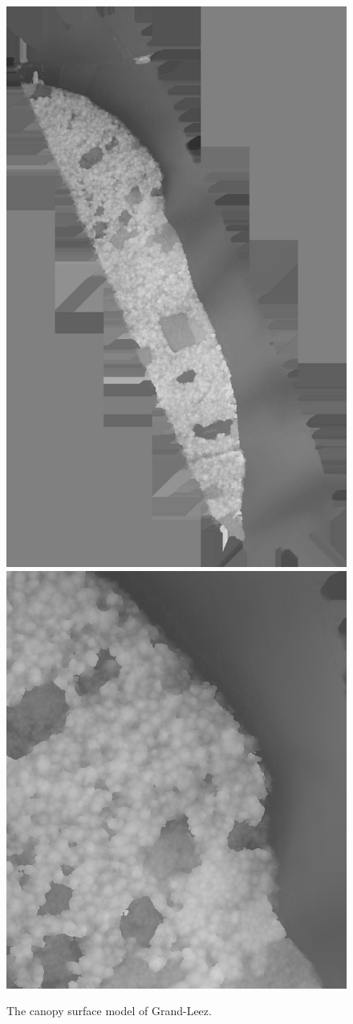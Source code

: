 \begin{figure}
\centering
\includegraphics[width=0.35\linewidth]{FIGS/UASGrandLeez/MNS_GL.jpg}
\includegraphics[width=0.48\linewidth]{FIGS/UASGrandLeez/MNS_GL_zoomin.jpg}
\caption{The canopy surface model of Grand-Leez.}
\label{fig:GL_MEC}
\end{figure}














